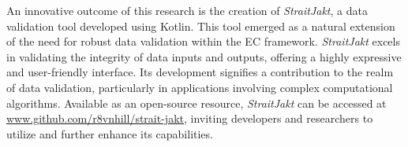     An innovative outcome of this research is the creation of \textit{StraitJakt}, a data validation tool developed 
    using Kotlin. This tool emerged as a natural extension of the need for robust data validation within the EC 
    framework. \textit{StraitJakt} excels in validating the integrity of data inputs and outputs, offering a highly 
    expressive and user-friendly interface. Its development signifies a contribution to the realm of data validation, 
    particularly in applications involving complex computational algorithms. Available as an open-source resource, 
    \textit{StraitJakt} can be accessed at \url{www.github.com/r8vnhill/strait-jakt}, inviting developers and 
    researchers to utilize and further enhance its capabilities.
